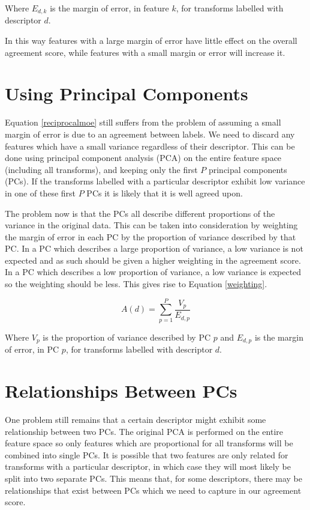 \documentclass[a4paper]{article}
\begin{document}
Where $E_{d,k}$ is the margin of error, in feature $k$, for transforms labelled with descriptor $d$.

In this way features with a large margin of error have little effect on the overall agreement score, while features with a
small margin or error will increase it.

\section*{Using Principal Components}
Equation \ref{reciprocalmoe} still suffers from the problem of assuming a small margin of error is due to an agreement
between labels. We need to discard any features which have a small variance regardless of their descriptor. This can be done
using principal component analysis (PCA) on the entire feature space (including all transforms), and keeping only the first
$P$ principal components (PCs). If the transforms labelled with a particular descriptor exhibit low variance in one of these
first $P$ PCs it is likely that it is well agreed upon.

The problem now is that the PCs all describe different proportions of the variance in the original data.  This can be taken
into consideration by weighting the margin of error in each PC by the proportion of variance described by that PC. In a PC
which describes a large proportion of variance, a low variance is not expected and as such should be given a higher
weighting in the agreement score. In a PC which describes a low proportion of variance, a low variance is expected so the
weighting should be less. This gives rise to Equation \ref{weighting}.

	\begin{equation}
		A(d) = \sum_{p=1}^{P} \frac{V_{p}}{E_{d,p}}
		\label{weighting}
	\end{equation}

Where $V_{p}$ is the proportion of variance described by PC $p$ and $E_{d,p}$ is the margin of error, in PC $p$, for
transforms labelled with descriptor $d$.

\section*{Relationships Between PCs}
One problem still remains that a certain descriptor might exhibit some relationship between two PCs. The original PCA is
performed on the entire feature space so only features which are proportional for all transforms will be combined into
single PCs. It is possible that two features are only related for transforms with a particular descriptor, in which case
they will most likely be split into two separate PCs. This means that, for some descriptors, there may be relationships that
exist between PCs which we need to capture in our agreement score.
\end{document}
